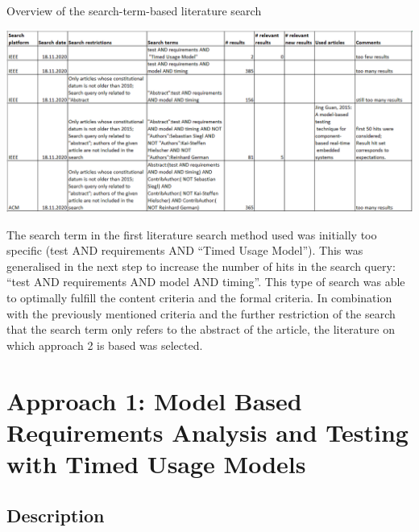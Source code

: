 \begin{table}[h]
	\centering
	\caption{Overview of the search-term-based literature search}
	\includegraphics[scale=0.7]{../images/SearchTermTable} 
\end{table}
The search term in the first literature search method used was initially
too specific (test AND requirements AND \enquote{Timed Usage
Model}). This was generalised in the next step to increase
the number of hits in the search query: \enquote{test AND requirements
AND model AND timing}. This type of search was able to
optimally fulfill the content criteria and the formal criteria. In
combination with the previously mentioned criteria and the further
restriction of the search that the search term only refers to the
abstract of the article, the literature on which approach 2 is based
was selected.

\section{Approach 1: Model Based Requirements Analysis and Testing with Timed
Usage Models\label{sec:Approach-1}}

\subsection{Description}

